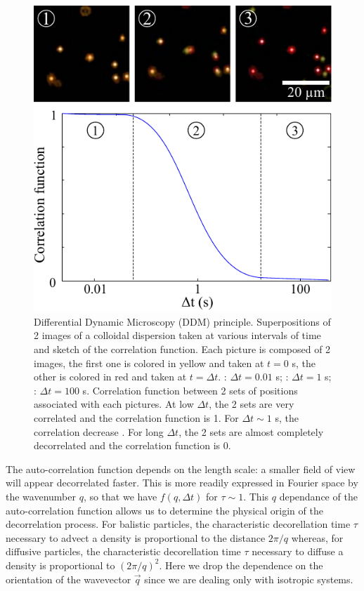 \documentclass[%
 aip,
 jmp,%
 amsmath,amssymb,
reprint,%
]{revtex4-1}
\newcommand*\circled[1]{\raisebox{0.5pt}{\textcircled{\raisebox{-.9pt} {#1}}}}
\begin{document}
\begin{figure}
\includegraphics[width=\linewidth]{ComparaisonImage.pdf}
\caption{Differential Dynamic Microscopy (DDM) principle. Superpositions of 2 images of a colloidal dispersion taken at various intervals of time and sketch of the correlation function. Each picture is composed of 2 images, the first one is colored in yellow and taken at $t = 0$ s, the other is colored in red and taken at $t = \Delta t$. \protect\circled{1}: $\Delta t = 0.01$ s; \protect\circled{2}: $\Delta t = 1$ s; \protect\circled{3}: $\Delta t = 100$ s. Correlation function between 2 sets of positions associated with each pictures. At low $\Delta t$, the 2 sets are very correlated \protect\circled{1} and the correlation function is 1. For $\Delta t \sim 1$ s, the correlation decrease \protect\circled{2}. For long $\Delta t$, the 2 sets are almost completely decorrelated \protect\circled{3} and the correlation function is 0.}
\label{SketchCorrelation}
\end{figure}

The auto-correlation function depends on the length scale: a smaller field of view will appear decorrelated faster. This is more readily expressed in Fourier space by the wavenumber $q$, so that we have $f(q, \Delta t)$ for $\tau \sim 1$. This $q$ dependance of the auto-correlation function allows us to determine the physical origin of the decorrelation process. For balistic particles, the characteristic decorellation time $\tau$ necessary to advect a density is  proportional to the distance $2\pi/q$ whereas, for diffusive particles, the characteristic decorellation time $\tau$ necessary to diffuse a density is proportional to $(2\pi/q)^2$. Here we drop the dependence on the orientation of the wavevector $\vec{q}$ since we are dealing only with isotropic systems. 
\end{document}
